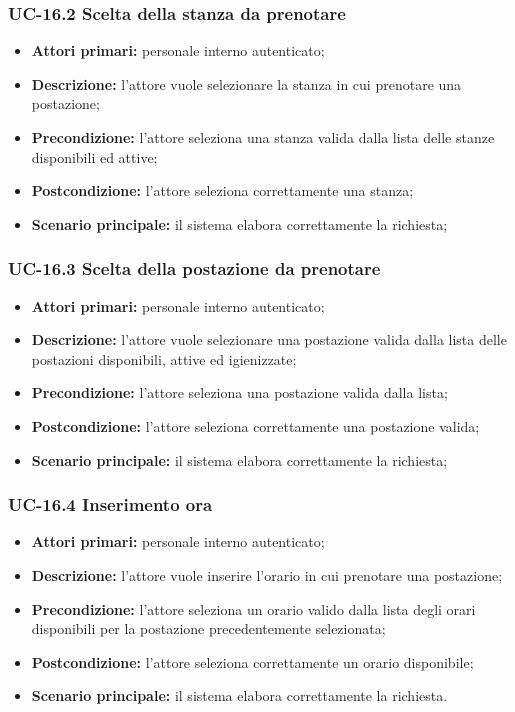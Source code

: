 \subsubsection{UC-16.2 Scelta della stanza da prenotare}

\begin{itemize}
\item \textbf{Attori primari:} personale interno autenticato;
\item \textbf{Descrizione:} l'attore vuole selezionare la stanza in cui prenotare una postazione;
\item \textbf{Precondizione:} l'attore seleziona una stanza valida dalla lista delle stanze disponibili ed attive;
\item \textbf{Postcondizione:} l'attore seleziona correttamente una stanza;
\item \textbf{Scenario principale:} il sistema elabora correttamente la richiesta;
\end{itemize}

\subsubsection{UC-16.3 Scelta della postazione da prenotare}

\begin{itemize}
\item \textbf{Attori primari:} personale interno autenticato;
\item \textbf{Descrizione:} l'attore vuole selezionare una postazione valida dalla lista delle postazioni disponibili, attive ed igienizzate;
\item \textbf{Precondizione:} l'attore seleziona una postazione valida dalla lista;
\item \textbf{Postcondizione:} l'attore seleziona correttamente una postazione valida;
\item \textbf{Scenario principale:} il sistema elabora correttamente la richiesta;
\end{itemize}

\subsubsection{UC-16.4 Inserimento ora}

\begin{itemize}
\item \textbf{Attori primari:} personale interno autenticato;
\item \textbf{Descrizione:} l'attore vuole inserire l'orario in cui prenotare una postazione;
\item \textbf{Precondizione:} l'attore seleziona un orario valido dalla lista degli orari disponibili per la postazione precedentemente selezionata;
\item \textbf{Postcondizione:} l'attore seleziona correttamente un orario disponibile;
\item \textbf{Scenario principale:} il sistema elabora correttamente la richiesta.
\end{itemize}

